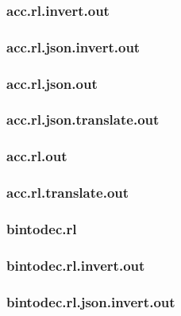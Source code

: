 \subsubsection{acc.rl.invert.out}
\label{app:acc_rl.invert.out}

\subsubsection{acc.rl.json.invert.out}
\label{app:acc_rl.json.invert.out}

\subsubsection{acc.rl.json.out}
\label{app:acc_rl.json.out}

\subsubsection{acc.rl.json.translate.out}
\label{app:acc_rl.json.translate.out}

\subsubsection{acc.rl.out}
\label{app:acc_rl.out}

\subsubsection{acc.rl.translate.out}
\label{app:acc_rl.translate.out}

\subsubsection{bintodec.rl}
\label{app:bintodec_rl}

\subsubsection{bintodec.rl.invert.out}
\label{app:bintodec_rl.invert.out}

\subsubsection{bintodec.rl.json.invert.out}
\label{app:bintodec_rl.json.invert.out}

